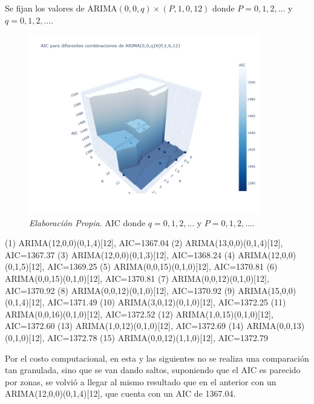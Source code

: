 \documentclass[12pt,letterpaper]{article}   %
\begin{document}
\newpage
Se fijan los valores de $\text{ARIMA}(0, 0, q) \times (P, 1, 0, 12)$ donde $P = 0, 1, 2, \dots$ y $q = 0, 1, 2, \dots$.
\begin{figure}[h!]
    \centering
    \includegraphics[width=0.9\textwidth]{imagenes/99-02.png}
    \caption{\textit{Elaboración Propia}. AIC donde $q = 0, 1, 2, \dots$ y $P = 0, 1, 2, \dots$.}
    \label{fig:FAC_FACP_yeo}
\end{figure}

\begin{smallconsole}[caption={donde $q = 0, 1, 2, \dots$ y $P = 0, 1, 2, \dots$.}]
(1) ARIMA(12,0,0)(0,1,4)[12], AIC=1367.04
(2) ARIMA(13,0,0)(0,1,4)[12], AIC=1367.37
(3) ARIMA(12,0,0)(0,1,3)[12], AIC=1368.24
(4) ARIMA(12,0,0)(0,1,5)[12], AIC=1369.25
(5) ARIMA(0,0,15)(0,1,0)[12], AIC=1370.81
(6) ARIMA(0,0,15)(0,1,0)[12], AIC=1370.81
(7) ARIMA(0,0,12)(0,1,0)[12], AIC=1370.92
(8) ARIMA(0,0,12)(0,1,0)[12], AIC=1370.92
(9) ARIMA(15,0,0)(0,1,4)[12], AIC=1371.49
(10) ARIMA(3,0,12)(0,1,0)[12], AIC=1372.25
(11) ARIMA(0,0,16)(0,1,0)[12], AIC=1372.52
(12) ARIMA(1,0,15)(0,1,0)[12], AIC=1372.60
(13) ARIMA(1,0,12)(0,1,0)[12], AIC=1372.69
(14) ARIMA(0,0,13)(0,1,0)[12], AIC=1372.78
(15) ARIMA(0,0,12)(1,1,0)[12], AIC=1372.79
\end{smallconsole}

Por el costo computacional, en esta y las siguientes no se realiza una comparación tan granulada, sino que se van dando saltos, suponiendo que el AIC es parecido por zonas, se volvió a llegar al mismo resultado que en el anterior con un ARIMA(12,0,0)(0,1,4)[12], que cuenta con un AIC de 1367.04.
\end{document}
